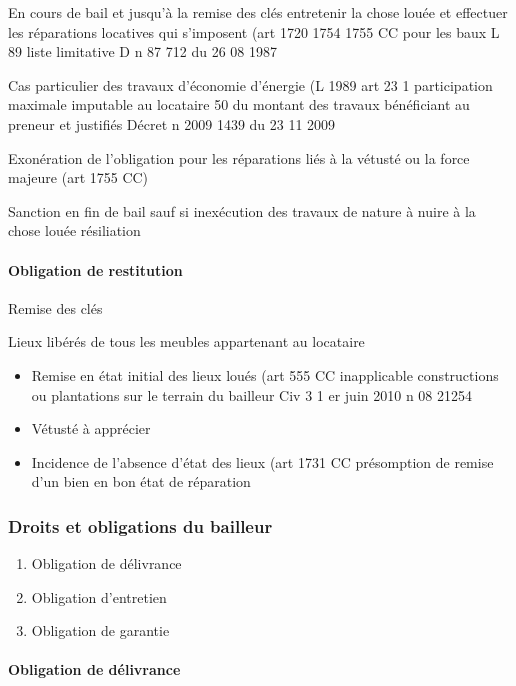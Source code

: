 \documentclass[10pt,a4paper,twoside]{article}
\begin{document}
			En cours de bail et jusqu’à la remise des clés entretenir la chose louée et
			effectuer les réparations locatives qui s’imposent (art 1720 1754 1755 CC
			pour les baux L 89 liste limitative D n 87 712 du 26 08 1987

			Cas particulier des travaux d’économie d’énergie (L 1989 art 23 1
			participation maximale imputable au locataire 50 du montant des travaux
			bénéficiant au preneur et justifiés Décret n 2009 1439 du 23 11 2009

			Exonération de l’obligation pour les réparations liés à la vétusté ou la force
			majeure (art 1755 CC)

			Sanction en fin de bail sauf si inexécution des travaux de nature à nuire à la
			chose louée résiliation

		\paragraph{Obligation de restitution}

			Remise des clés

			Lieux libérés de tous les meubles appartenant au locataire
			\begin{itemize}
				\item Remise en état initial des lieux loués (art 555 CC inapplicable
				constructions ou plantations sur le terrain du bailleur Civ
				3 1 er juin 2010 n 08 21254

				\item Vétusté à apprécier

				\item Incidence de l’absence d’état des lieux (art 1731 CC
				présomption de remise d’un bien en bon état de réparation
			\end{itemize}

		\subsubsection{Droits et obligations du bailleur}

			\begin{enumerate}
				\item Obligation de délivrance
				\item Obligation d’entretien
				\item Obligation de garantie
			\end{enumerate}

			\paragraph{Obligation de délivrance}
\end{document}
